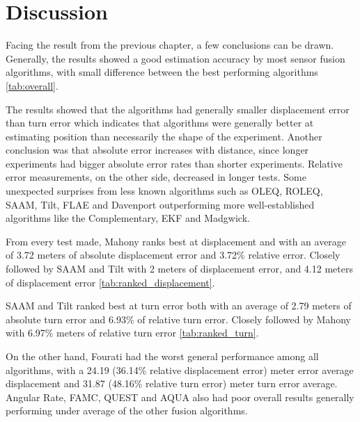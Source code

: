 \section{Discussion}
Facing the result from the previous chapter, a few conclusions can be drawn. Generally, the results showed a good estimation accuracy by most sensor fusion algorithms, with small difference between the best performing algorithms \ref{tab:overall}.



The results showed that the algorithms had generally smaller displacement error than turn error which indicates that algorithms were generally better at estimating position than necessarily the shape of the experiment. Another conclusion was that absolute error increases with distance, since longer experiments had bigger absolute error rates than shorter experiments. Relative error measurements, on the other side, decreased in longer tests. Some unexpected surprises from less known algorithms such as OLEQ, ROLEQ, SAAM, Tilt, FLAE and Davenport outperforming more well-established algorithms like the Complementary, EKF and Madgwick.

From every test made, Mahony ranks best at displacement and with an average of 3.72 meters of absolute displacement error and 3.72\% relative error. Closely followed by SAAM and Tilt with 2 meters of displacement error, and 4.12 meters of displacement error \ref{tab:ranked_displacement}.



SAAM and Tilt ranked best at turn error both with an average of 2.79 meters of absolute turn error and 6.93\% of relative turn error. Closely followed by Mahony with 6.97\% meters of relative turn error \ref{tab:ranked_turn}.



On the other hand, Fourati had the worst general performance among all algorithms, with a 24.19 (36.14\% relative displacement error) meter error average displacement and 31.87 (48.16\% relative turn error) meter turn error average. Angular Rate, FAMC, QUEST and AQUA also had poor overall results generally performing under average of the other fusion algorithms.

